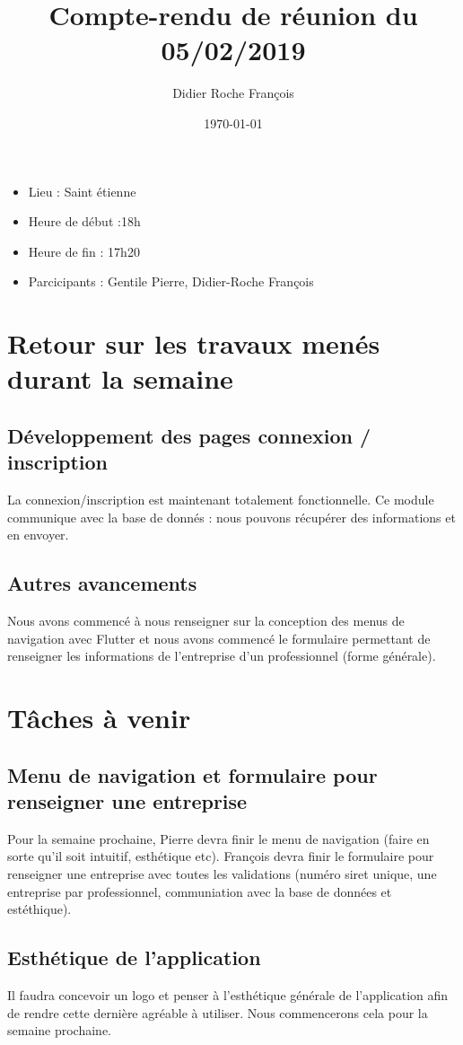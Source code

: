 \documentclass[a4paper]{article}
\title{Compte-rendu de réunion du 05/02/2019}
\author{Didier Roche François}
\date{\today}
\begin{document}
\renewcommand{\contentsname}{Ordre du jour}
\maketitle
\thispagestyle{fancy}


\begin{itemize}
\item Lieu : Saint étienne
\item Heure de début :18h
\item Heure de fin : 17h20
\item Parcicipants : Gentile Pierre, Didier-Roche François
\end{itemize}

\bigbreak
\bigbreak
\bigbreak

\tableofcontents


\newpage

\section{Retour sur les travaux menés durant la semaine}
\subsection{Développement des pages connexion / inscription}
La connexion/inscription est maintenant totalement fonctionnelle. Ce module communique avec la base de donnés : nous pouvons récupérer des informations et en envoyer.


\subsection{Autres avancements}
Nous avons commencé à nous renseigner sur la conception des menus de navigation avec Flutter et nous avons commencé le formulaire permettant de renseigner les informations de l'entreprise d'un professionnel (forme générale).

\section{Tâches à venir}
\subsection{Menu de navigation et formulaire pour renseigner une entreprise}
Pour la semaine prochaine, Pierre devra finir le menu de navigation (faire en sorte qu'il soit intuitif, esthétique etc).
François devra finir le formulaire pour renseigner une entreprise avec toutes les validations (numéro siret unique, une entreprise par professionnel, communiation avec la base de données et estéthique).
\subsection{Esthétique de l'application}
Il faudra concevoir un logo et penser à l'esthétique générale de l'application afin de rendre cette dernière agréable à utiliser. Nous commencerons cela pour la semaine prochaine.
\end{document}
